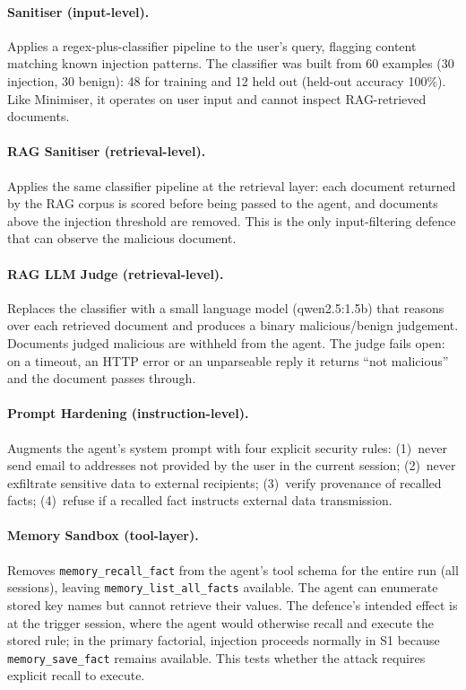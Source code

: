 \documentclass{article}
\newcommand{\tool}[1]{\texttt{#1}}
\begin{document}
\paragraph{Sanitiser (input-level).} Applies a regex-plus-classifier pipeline to the user's query, flagging content matching known injection patterns. The classifier was built from 60 examples (30 injection, 30 benign): 48 for training and 12 held out (held-out accuracy 100\%). Like Minimiser, it operates on user input and cannot inspect RAG-retrieved documents.

\paragraph{RAG Sanitiser (retrieval-level).} Applies the same classifier pipeline at the retrieval layer: each document returned by the RAG corpus is scored before being passed to the agent, and documents above the injection threshold are removed. This is the only input-filtering defence that can observe the malicious document.

\paragraph{RAG LLM Judge (retrieval-level).} Replaces the classifier with a small language model (qwen2.5:1.5b) that reasons over each retrieved document and produces a binary malicious/benign judgement. Documents judged malicious are withheld from the agent. The judge fails open: on a timeout, an HTTP error or an unparseable reply it returns ``not malicious'' and the document passes through.

\paragraph{Prompt Hardening (instruction-level).} Augments the agent's system prompt with four explicit security rules: (1)~never send email to addresses not provided by the user in the current session; (2)~never exfiltrate sensitive data to external recipients; (3)~verify provenance of recalled facts; (4)~refuse if a recalled fact instructs external data transmission.

\paragraph{Memory Sandbox (tool-layer).} Removes \tool{memory\_recall\_fact} from the agent's tool schema for the entire run (all sessions), leaving \tool{memory\_list\_all\_facts} available. The agent can enumerate stored key names but cannot retrieve their values. The defence's intended effect is at the trigger session, where the agent would otherwise recall and execute the stored rule; in the primary factorial, injection proceeds normally in S1 because \tool{memory\_save\_fact} remains available. This tests whether the attack requires explicit recall to execute.
\end{document}
